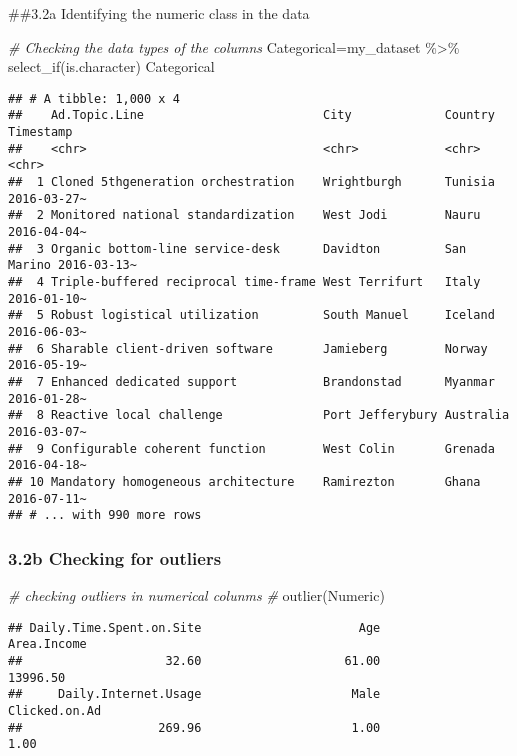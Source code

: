 \documentclass[
]{article}
\newenvironment{Shaded}{\begin{snugshade}}{\end{snugshade}}
\newcommand{\CommentTok}[1]{\textcolor[rgb]{0.56,0.35,0.01}{\textit{#1}}}
\newcommand{\FunctionTok}[1]{\textcolor[rgb]{0.00,0.00,0.00}{#1}}
\newcommand{\NormalTok}[1]{#1}
\newcommand{\OtherTok}[1]{\textcolor[rgb]{0.56,0.35,0.01}{#1}}
\newcommand{\SpecialCharTok}[1]{\textcolor[rgb]{0.00,0.00,0.00}{#1}}
\begin{document}
\#\#3.2a Identifying the numeric class in the data

\begin{Shaded}
\begin{Highlighting}[]
\CommentTok{\# Checking the data types of the columns}
\NormalTok{Categorical}\OtherTok{=}\NormalTok{my\_dataset }\SpecialCharTok{\%\textgreater{}\%} \FunctionTok{select\_if}\NormalTok{(is.character)}
\NormalTok{Categorical}
\end{Highlighting}
\end{Shaded}

\begin{verbatim}
## # A tibble: 1,000 x 4
##    Ad.Topic.Line                         City             Country    Timestamp  
##    <chr>                                 <chr>            <chr>      <chr>      
##  1 Cloned 5thgeneration orchestration    Wrightburgh      Tunisia    2016-03-27~
##  2 Monitored national standardization    West Jodi        Nauru      2016-04-04~
##  3 Organic bottom-line service-desk      Davidton         San Marino 2016-03-13~
##  4 Triple-buffered reciprocal time-frame West Terrifurt   Italy      2016-01-10~
##  5 Robust logistical utilization         South Manuel     Iceland    2016-06-03~
##  6 Sharable client-driven software       Jamieberg        Norway     2016-05-19~
##  7 Enhanced dedicated support            Brandonstad      Myanmar    2016-01-28~
##  8 Reactive local challenge              Port Jefferybury Australia  2016-03-07~
##  9 Configurable coherent function        West Colin       Grenada    2016-04-18~
## 10 Mandatory homogeneous architecture    Ramirezton       Ghana      2016-07-11~
## # ... with 990 more rows
\end{verbatim}

\hypertarget{b-checking-for-outliers}{%
\subsubsection{3.2b Checking for
outliers}\label{b-checking-for-outliers}}

\begin{Shaded}
\begin{Highlighting}[]
\CommentTok{\# checking outliers in numerical colunms}
\CommentTok{\#}
\FunctionTok{outlier}\NormalTok{(Numeric)}
\end{Highlighting}
\end{Shaded}

\begin{verbatim}
## Daily.Time.Spent.on.Site                      Age              Area.Income 
##                    32.60                    61.00                 13996.50 
##     Daily.Internet.Usage                     Male            Clicked.on.Ad 
##                   269.96                     1.00                     1.00
\end{verbatim}
\end{document}
